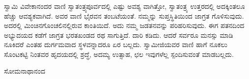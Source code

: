 ಸ್ವಾಮಿ ವಿವೇಕಾನಂದರ ವಾಣಿ ಸ್ವಾತಂತ್ರ್ಯಪೂರ್ವದಲ್ಲಿ ಎಷ್ಟು ಅವಶ್ಯ ವಾಗಿತ್ತೋ, ಸ್ವಾತಂತ್ರ್ಯ ಉತ್ತರದಲ್ಲಿ ಅದಕ್ಕಿಂತಲೂ ಹೆಚ್ಚು ಆವಶ್ಯಕವಾಗಿದೆ. ಅವರ ವಾಣಿ ಭೈರವನ ತಂಬಟೆಯಂತೆ. ನಮ್ಮನ್ನು ಸುಪ್ತಸ್ಥಿತಿಯಿಂದ ಜಾಗ್ರತ ಗೊಳಿಸುವುದು. ಅದರಲ್ಲಿ ಮಿಂಚಿನಗೊಂಚಲಿನಲ್ಲಿರುವ ಕಾಂತಿಯಿದೆ. ಅದು ನಮ್ಮ ಜಡತನವನ್ನು ಪರಿಹರಿಸುವುದು. ಈಗ ಪತನದಿಂದ ಅಭ್ಯುದಯದ ಕಡೆಗೆ ಜಾಗ್ರತ ಭರತಖಂಡದ ರಥ ಸಾಗುತ್ತಿದೆ. ದಾರಿ ಕಡಿದು. ಆದರೆ ಸರ್ವರೂ ಮನಸ್ಸು ಮಾಡಿ ನೂಕಿದರೆ ಎಂತಹ ದುರ್ಗಮವಾದ ಸ್ಥಳವನ್ನಾದರೂ ಏರ ಬಲ್ಲದು. ಸ್ವಾಮೀಜಿಯವರ ವಾಣಿ ಹಾಗೆ ನೂಕಲು ಸೊಂಟಕಟ್ಟಿ ನಿಂತವರ ಹೃದಯದಲ್ಲಿ ಶ್ರದ್ಧೆ, ಅದಮ್ಯ ಉತ್ಸಾಹ, ಛಲ ಇವುಗಳೆಲ್ಲ ಸ್ಪಂದಿಸುವಂತೆ ಮಾಡಬಲ್ಲದು.

\begin{flushright}
ಸೋಮನಾಥಾನಂದ
\end{flushright}

